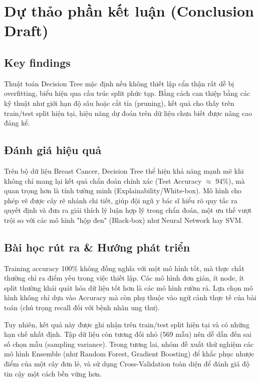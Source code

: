 \chapter{Dự thảo phần kết luận (Conclusion Draft)}
\label{chap:conclusion}

\section{Key findings}
Thuật toán Decision Tree mặc định nếu không thiết lập cẩn thận rất dễ bị overfitting, biểu hiện qua cấu trúc split phức tạp. Bằng cách can thiệp bằng các kỹ thuật như giới hạn độ sâu hoặc cắt tỉa (pruning), kết quả cho thấy trên train/test split hiện tại, hiệu năng dự đoán trên dữ liệu chưa biết được nâng cao đáng kể.

\section{Đánh giá hiệu quả}
Trên bộ dữ liệu Breast Cancer, Decision Tree thể hiện khả năng mạnh mẽ khi không chỉ mang lại kết quả chẩn đoán chính xác (Test Accuracy $\approx$ 94\%), mà quan trọng hơn là tính tường minh (Explainability/White-box). Mô hình cho phép vẽ được cây rẽ nhánh chi tiết, giúp đội ngũ y bác sĩ hiểu rõ quy tắc ra quyết định và đưa ra giải thích lý luận hợp lý trong chẩn đoán, một ưu thế vượt trội so với các mô hình "hộp đen" (Black-box) như Neural Network hay SVM.

\section{Bài học rút ra \& Hướng phát triển}
Training accuracy 100\% không đồng nghĩa với một mô hình tốt, mà thực chất thường chỉ ra điểm yếu trong việc thiết lập. Các mô hình đơn giản, ít node, ít split thường khái quát hóa dữ liệu tốt hơn là các mô hình rườm rà. Lựa chọn mô hình không chỉ dựa vào Accuracy mà còn phụ thuộc vào ngữ cảnh thực tế của bài toán (chú trọng recall đối với bệnh nhân ung thư).

Tuy nhiên, kết quả này được ghi nhận trên train/test split hiện tại và có những hạn chế nhất định. Tập dữ liệu còn tương đối nhỏ (569 mẫu) nên dễ dẫn đến sai số chọn mẫu (sampling variance). Trong tương lai, nhóm đề xuất thử nghiệm các mô hình Ensemble (như Random Forest, Gradient Boosting) để khắc phục nhược điểm của một cây đơn lẻ, và sử dụng Cross-Validation toàn diện để đánh giá độ tin cậy một cách bền vững hơn.
